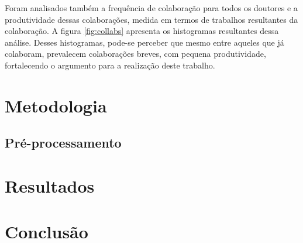 \documentclass[12pt]{article}
\begin{document}
Foram analisados também a frequência de colaboração para todos os doutores e a produtividade dessas colaborações, medida em termos de trabalhos resultantes da colaboração.
A figura \ref{fig:collabs} apresenta os histogramas resultantes dessa análise.
Desses histogramas, pode-se perceber que mesmo entre aqueles que já colaboram, prevalecem colaborações breves, com pequena produtividade, fortalecendo o argumento para a realização deste trabalho.

\section{Metodologia}
\label{sec:methods}

\subsection{Pré-processamento}
\label{sec:preprocess}

\section{Resultados}
\label{sec:results}

\section{Conclusão}
\label{sec:conclusion}



\end{document}
